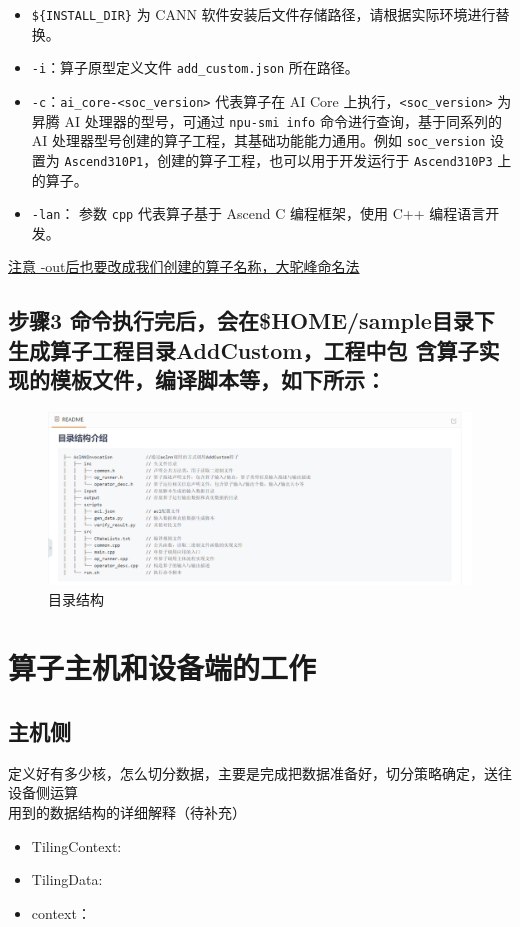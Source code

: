 \documentclass{article}
\begin{document}
    \begin{itemize}
    	\item \texttt{\$\{INSTALL\_DIR\}} 为 CANN 软件安装后文件存储路径，请根据实际环境进行替换。
    	\item \texttt{-i}：算子原型定义文件 \texttt{add\_custom.json} 所在路径。
    	\item \texttt{-c}：\texttt{ai\_core-<soc\_version>} 代表算子在 AI Core 上执行，\texttt{<soc\_version>} 为昇腾 AI 处理器的型号，可通过 \texttt{npu-smi info} 命令进行查询，基于同系列的 AI 处理器型号创建的算子工程，其基础功能能力通用。例如 \texttt{soc\_version} 设置为 \texttt{Ascend310P1}，创建的算子工程，也可以用于开发运行于 \texttt{Ascend310P3} 上的算子。
    	\item \texttt{-lan}： 参数 \texttt{cpp} 代表算子基于 Ascend C 编程框架，使用 C++ 编程语言开发。
    \end{itemize}
    \underline{注意 -out后也要改成我们创建的算子名称，大驼峰命名法}
    \newpage
    \subsection{步骤3 命令执行完后，会在\$HOME/sample目录下生成算子工程目录AddCustom，工程中包
    	含算子实现的模板文件，编译脚本等，如下所示：}
	
	\begin{figure}[h]
		\centering
		\includegraphics[width=1\linewidth]{screenshot001} %
		\caption{目录结构}
		\label{fig:screenshot001}
	\end{figure}
		\section{算子主机和设备端的工作}
	\subsection{主机侧}
	定义好有多少核，怎么切分数据，主要是完成把数据准备好，切分策略确定，送往设备侧运算\\
	用到的数据结构的详细解释（待补充）
	\begin{itemize}
		\item TilingContext:
		\item TilingData:
		\item context：
	\end{itemize}
\end{document}
